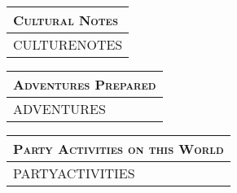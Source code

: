 \documentclass[12pt,letterpaper,twocolumn]{article}
\begin{document}
\begin{tabularx}{\linewidth}{| X |}
    \multicolumn{1}{l}{\textsc{Cultural Notes}} \\
    \hline
    CULTURENOTES \\
    \hline
\end{tabularx}

\begin{tabularx}{\linewidth}{| X |}
    \multicolumn{1}{l}{\textsc{Adventures Prepared}} \\
    \hline
    ADVENTURES \\
    \hline
\end{tabularx}

\begin{tabularx}{\linewidth}{| X |}
    \multicolumn{1}{l}{\textsc{Party Activities on this World}} \\
    \hline
    PARTYACTIVITIES \\
    \hline
\end{tabularx}
\end{document}
